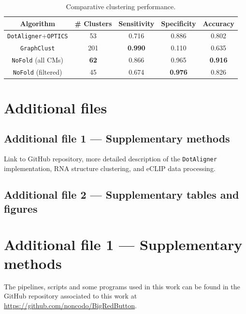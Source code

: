 \documentclass{bmcart}
\newcommand\dotaligner{\texttt{DotAligner}}
\newcommand\nofold{\texttt{NoFold}}
\begin{document}
\begin{backmatter}
\begin{table}[h!]
\caption{ Comparative clustering performance. }
 \begin{tabular}{ccccc}
 \hline
 Algorithm & \# Clusters & Sensitivity & Specificity & Accuracy \\
 \hline
 \dotaligner{}+\texttt{OPTICS} & 53 & 0.716 & 0.886& 0.802\\
 \texttt{GraphClust} & 201 & \textbf{0.990} & 0.110 & 0.635\\ %
 \nofold{} (all CMs) & \textbf{62} & 0.866 & 0.965 & \textbf{0.916 }\\ %
 \nofold{} (filtered) & 45 & 0.674 & \textbf{0.976} & 0.826\\ %
 \hline
 \end{tabular}
\end{table}




\section*{Additional files}

 \subsection*{Additional file 1 --- Supplementary methods}

 Link to GitHub repository, more detailed description of the \dotaligner{} implementation, RNA structure clustering, and eCLIP data processing. 

 \subsection*{Additional file 2 --- Supplementary tables and figures}

\end{backmatter}

\clearpage

\section*{Additional file 1 --- Supplementary methods}
The pipelines, scripts and some programs used in this work can be found in the 
GitHub repository associated to this work at \url{https://github.com/noncodo/BigRedButton}. 
\end{document}
